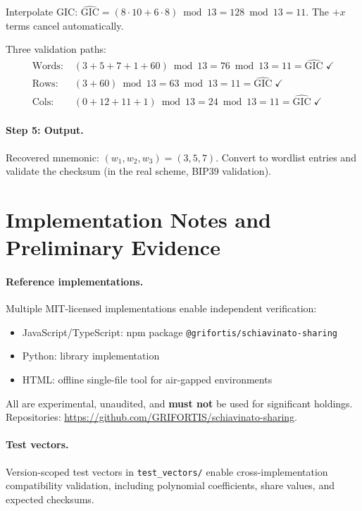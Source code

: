 \documentclass[11pt]{article}
\begin{document}
Interpolate GIC: $\hat{\text{GIC}} = (8 \cdot 10 + 6 \cdot 8) \bmod 13 = 128 \bmod 13 = 11$. The $+x$ terms cancel automatically.

Three validation paths:
\begin{align*}
\text{Words:}\; &(3{+}5{+}7{+}1{+}60) \bmod 13 = 76 \bmod 13 = 11 = \hat{\text{GIC}} \;\checkmark \\
\text{Rows:}\; &(3{+}60) \bmod 13 = 63 \bmod 13 = 11 = \hat{\text{GIC}} \;\checkmark \\
\text{Cols:}\; &(0{+}12{+}11{+}1) \bmod 13 = 24 \bmod 13 = 11 = \hat{\text{GIC}} \;\checkmark
\end{align*}

\paragraph{Step 5: Output.} Recovered mnemonic: $(w_1, w_2, w_3) = (3, 5, 7)$. Convert to wordlist entries and validate the checksum (in the real scheme, BIP39 validation).

\section{Implementation Notes and Preliminary Evidence}
\label{sec:implementation}

\paragraph{Reference implementations.} Multiple MIT-licensed implementations enable independent verification:
\begin{itemize}[noitemsep]
    \item JavaScript/TypeScript: npm package \texttt{@grifortis/\allowbreak schiavinato-sharing}
    \item Python: library implementation
    \item HTML: offline single-file tool for air-gapped environments
\end{itemize}
All are experimental, unaudited, and \textbf{must not} be used for significant holdings. Repositories: \url{https://github.com/GRIFORTIS/schiavinato-sharing}.

\paragraph{Test vectors.} Version-scoped test vectors in \texttt{test\_vectors/} enable cross-implementation compatibility validation, including polynomial coefficients, share values, and expected checksums.
\end{document}
